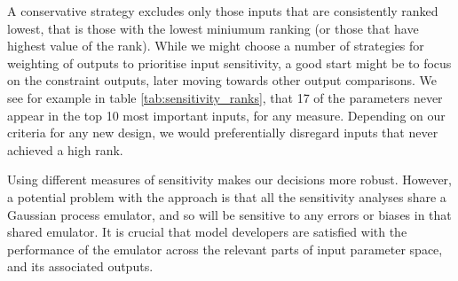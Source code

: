 \documentclass[gmd, manuscript]{copernicus}
\begin{document}
A conservative strategy excludes only those inputs that are consistently ranked lowest, that is those with the lowest miniumum ranking (or those that have highest value of the rank). While we might choose a number of strategies for weighting of outputs to prioritise input sensitivity, a good start might be to focus on the constraint outputs, later moving towards other output comparisons. We see for example in table \ref{tab:sensitivity_ranks}, that 17 of the parameters never appear in the top 10 most important inputs, for any measure. Depending on our criteria for any new design, we would preferentially disregard inputs that never achieved a high rank.

Using different measures of sensitivity makes our decisions more robust. However, a potential problem with the approach is that all the sensitivity analyses share a Gaussian process emulator, and so will be sensitive to any errors or biases in that shared emulator. It is crucial that model developers are satisfied with the performance of the emulator across the relevant parts of input parameter space, and its associated outputs.
\end{document}
